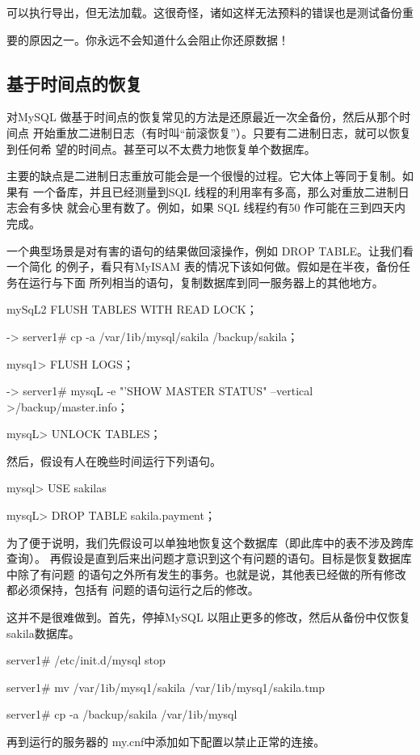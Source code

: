 可以执行导出，但无法加载。这很奇怪，诸如这样无法预料的错误也是测试备份重

要的原因之一。你永远不会知道什么会阻止你还原数据！

\subsection{基于时间点的恢复}
对MySQL 做基于时间点的恢复常见的方法是还原最近一次全备份，然后从那个时间点
开始重放二进制日志（有时叫“前滚恢复”）。只要有二进制日志，就可以恢复到任何希
望的时间点。甚至可以不太费力地恢复单个数据库。

主要的缺点是二进制日志重放可能会是一个很慢的过程。它大体上等同于复制。如果有
一个备库，并且已经测量到SQL 线程的利用率有多高，那么对重放二进制日志会有多快
就会心里有数了。例如，如果 SQL 线程约有50%
作可能在三到四天内完成。

一个典型场景是对有害的语句的结果做回滚操作，例如 DROP TABLE。让我们看一个简化
的例子，看只有MyISAM 表的情况下该如何做。假如是在半夜，备份任务在运行与下面
所列相当的语句，复制数据库到同一服务器上的其他地方。

mySqL2 FLUSH TABLES WITH READ LOCK；

-> server1# cp -a /var/1ib/mysql/sakila /backup/sakila；

mysq1> FLUSH LOGS；

-> server1# mysqL -e "'SHOW MASTER STATUS" --vertical >/backup/master.info；

mysqL> UNLOCK TABLES；

然后，假设有人在晚些时间运行下列语句。

mysql> USE sakilas

mysqL> DROP TABLE sakila.payment；

为了便于说明，我们先假设可以单独地恢复这个数据库（即此库中的表不涉及跨库查询）。
再假设是直到后来出问题才意识到这个有问题的语句。目标是恢复数据库中除了有问题
的语句之外所有发生的事务。也就是说，其他表已经做的所有修改都必须保持，包括有
问题的语句运行之后的修改。

这并不是很难做到。首先，停掉MySQL 以阻止更多的修改，然后从备份中仅恢复
sakila数据库。

server1# /etc/init.d/mysql stop

server1# mv /var/1ib/mysq1/sakila /var/1ib/mysq1/sakila.tmp

server1# cp -a /backup/sakila /var/1ib/mysql

再到运行的服务器的 my.cnf中添加如下配置以禁止正常的连接。


